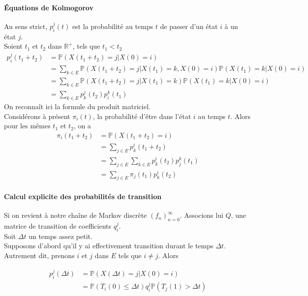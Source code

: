 \documentclass[a4paper]{article}
\theoremstyle{plain}
\theoremstyle{definition}
\theoremstyle{remark}
\begin{document}
\paragraph{Équations de Kolmogorov}
Au sens strict, $ p_i^j (t)$ est la probabilité au temps $t$ de passer d'un état $i$ à un état $j$.\\
Soient $t_1$ et $t_2$ dans $\mathbb{R}^+$, tels que $t_1<t_2$
\begin{align*}
p_i^j(t_1+t_2)&=\mathbb{P}(X(t_1+t_2)=j | X(0)=i)\\
&=\sum_{k\in E}\mathbb{P}(X(t_1+t_2)=j|X(t_1)=k,X(0)=i)\mathbb{P}(X(t_1)=k|X(0)=i)\\
&=\sum_{k\in E}\mathbb{P}(X(t_1+t_2)=j|X(t_1)=k)\mathbb{P}(X(t_1)=k|X(0)=i)\\
&=\sum_{k\in E}p_k^j(t_2)p_i^k(t_1)
\end{align*}
On reconnaît ici la formule du produit matriciel.\\
Considérons à présent $\pi_i(t)$, la probabilité d'être dans l'état $i$ au temps $t$. Alors pour les mêmes $t_1$ et $t_2$, on a
\begin{align*}
\pi_i(t_1+t_2)&=\mathbb{P}(X(t_1+t_2)=i)\\
&=\sum_{j\in E}p_k^i(t_1+t_2)\\
&=\sum_{j\in E}\sum_{k\in E}p_k^i(t_2)p_j^k(t_1)\\
&=\sum_{j\in E}\pi_j(t_1)p_k^i(t_2)
\end{align*}
\paragraph{Calcul explicite des probabilités de transition}
Si on revient à notre chaîne de Markov discrète $(f_n)_{n=0}^{\infty}$. Associons lui $Q$, une matrice de transition de coefficients $q_i^j$.\\
Soit $\Delta t$ un temps assez petit.\\
Supposons d'abord qu'il y ai effectivement transition durant le temps $\Delta t$. Autrement dit, prenons $i$ et $j$ dans $E$ tels que $i\neq j$.
Alors 

\begin{align*}
p_i^j(\Delta t)&=\mathbb{P}(X(\Delta t)=j|X(0)=i) \\
&=\mathbb{P}(T_i(0)\leqslant\Delta t)q_i^j\mathbb{P}(T_j(1)>\Delta t)
\end{align*}
\end{document}
